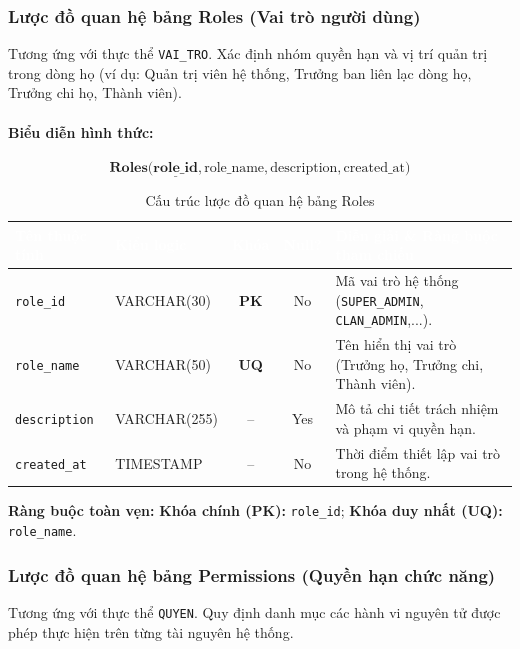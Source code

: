 \subsubsection{Lược đồ quan hệ bảng Roles (Vai trò người dùng)}
Tương ứng với thực thể \texttt{VAI\_TRO}. Xác định nhóm quyền hạn và vị trí quản trị trong dòng họ (ví dụ: Quản trị viên hệ thống, Trưởng ban liên lạc dòng họ, Trưởng chi họ, Thành viên).

\paragraph{Biểu diễn hình thức:}
\[
\textbf{Roles}\big(
\underline{\textbf{role\_id}}, \text{role\_name}, \text{description}, \text{created\_at}
\big)
\]

\begin{table}[H]
    \centering
    \small
    \renewcommand{\arraystretch}{1.2}
    \begin{tabularx}{\textwidth}{p{3.0cm} p{2.6cm} c c X}
        \toprule
        \rowcolor{tableheader}\textcolor{white}{\textbf{Tên thuộc tính}} & \textcolor{white}{\textbf{Kiểu logic}} & \textcolor{white}{\textbf{Khóa}} & \textcolor{white}{\textbf{Null?}} & \textcolor{white}{\textbf{Diễn giải \& Ràng buộc tham chiếu}} \\
        \midrule
        \rowcolor{tablerowalt}
        \texttt{role\_id} & VARCHAR(30) & \textcolor{pkcolor}{\textbf{PK}} & No & Mã vai trò hệ thống (\texttt{SUPER\_ADMIN}, \texttt{CLAN\_ADMIN},...). \\
        \texttt{role\_name} & VARCHAR(50) & \textbf{UQ} & No & Tên hiển thị vai trò (Trưởng họ, Trưởng chi, Thành viên). \\
        \rowcolor{tablerowalt}
        \texttt{description} & VARCHAR(255) & -- & Yes & Mô tả chi tiết trách nhiệm và phạm vi quyền hạn. \\
        \texttt{created\_at} & TIMESTAMP & -- & No & Thời điểm thiết lập vai trò trong hệ thống. \\
        \bottomrule
    \end{tabularx}
    \caption{Cấu trúc lược đồ quan hệ bảng Roles}
    \label{tab:schema_roles}
\end{table}

\noindent\textbf{Ràng buộc toàn vẹn:} \textbf{Khóa chính (PK):} \texttt{role\_id}; \textbf{Khóa duy nhất (UQ):} \texttt{role\_name}.

\subsubsection{Lược đồ quan hệ bảng Permissions (Quyền hạn chức năng)}
Tương ứng với thực thể \texttt{QUYEN}. Quy định danh mục các hành vi nguyên tử được phép thực hiện trên từng tài nguyên hệ thống.

